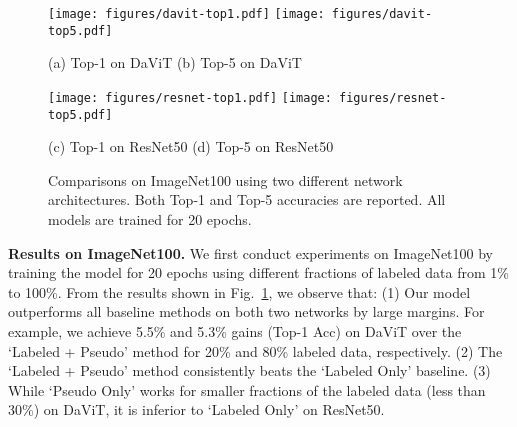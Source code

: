 


\begin{figure}[t]
  \texttt{[image: figures/davit-top1.pdf]}\hfill
  \texttt{[image: figures/davit-top5.pdf]}
  
  \vspace{-3pt} \small{\hspace{70pt} (a) Top-1 on DaViT \hspace{125pt} (b) Top-5 on DaViT}
  
  \texttt{[image: figures/resnet-top1.pdf]}\hfill
  \texttt{[image: figures/resnet-top5.pdf]}

  \vspace{-3pt} \small{\hspace{63pt} (c) Top-1 on ResNet50 \hspace{115pt} (d) Top-5 on ResNet50}
  \vspace{-0.05in}
  \caption{Comparisons on ImageNet100 using two different network architectures. Both Top-1 and Top-5 accuracies are reported. All models are trained for 20 epochs.
  }
  \label{fig:classification_fraction}
  \vspace{-16pt}
\end{figure}


\textbf{Results on ImageNet100.} 
We first conduct experiments on ImageNet100 by training the model for 20 epochs using different fractions of labeled data from 1\% to 100\%.
From the results shown in Fig.~\ref{fig:classification_fraction}, we observe that: (1) Our model outperforms all baseline methods on both two networks by large margins.
For example, we achieve 5.5\% and 5.3\% gains (Top-1 Acc) on DaViT over the `Labeled + Pseudo' method for 20\% and 80\% labeled data, respectively.
(2) The `Labeled + Pseudo' method consistently beats the `Labeled Only' baseline.
(3) While `Pseudo Only' works for smaller fractions of the labeled data (less than 30\%) on DaViT, it is inferior to `Labeled Only' on ResNet50.

